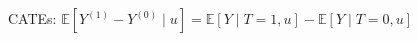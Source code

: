 \documentclass[preview]{standalone}
\begin{document}
\begin{center}
CATEs: $\mathbb{E}[Y^{(1)} - Y^{(0)} \; | \; u] = \mathbb{E}[Y \; | \; T=1, u] - \mathbb{E}[Y \; | \; T=0, u]$
\end{center}
\end{document}
